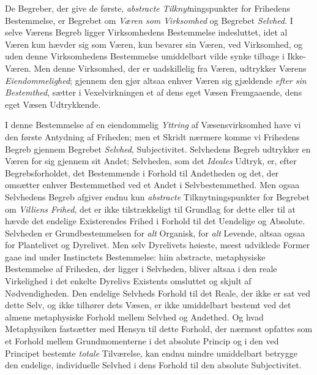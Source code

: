 De Begreber, der give de første, \emph{abstracte Tilknyt}ningspunkter for
Frihedens Bestemmelse, er Begrebet om \emph{Væren som Virksomhed} og Begrebet
\emph{Selvhed}. I selve Værens Begreb ligger Virksomhedens Bestemmelse
indesluttet, idet al Væren kun hævder sig som Væren, kun bevarer sin Væren, ved
Virksomhed, og uden denne Virksomhedens Bestemmelse umiddelbart vilde synke
tilbage i Ikke-Væren. Men denne Virksomhed, der er uadskillelig fra Væren,
udtrykker Værens \emph{Eiendommelighed}; gjennem den gjør altsaa enhver Væren sig
gjældende \emph{efter sin Bestemthed}, sætter i Vexelvirkningen et af dens eget
Væsen Fremgaaende, dens eget Væsen Udtrykkende.

I denne Bestemmelse af en eiendommelig \emph{Yttring} af Væsensvirksomhed have vi
den første Antydning af Friheden; men et Skridt nærmere komme vi Frihedens Begreb
gjennem Begrebet \emph{Selvhed}, Subjectivitet. Selvhedens Begreb udtrykker en
Væren for sig gjennem sit Andet; Selvheden, som det \emph{Ideales} Udtryk, er,
efter Begrebsforholdet, det Bestemmende i Forhold til Andetheden og det, der
omsætter
 enhver Bestemmethed ved et Andet i Selvbestemmethed. Men ogsaa Selvhedens Begreb
afgiver endnu kun \emph{abstracte} Tilknytningspunkter for Begrebet om
\emph{Villiens Frihed}, det er ikke tilstrækkeligt til Grundlag for dette eller
til at hævde det endelige Existerendes Frihed i Forhold til det Uendelige og
Absolute. Selvheden er Grundbestemmelsen for \emph{alt} Organisk, for \emph{alt}
Levende, altsaa ogsaa for Plantelivet og Dyrelivet. Men selv Dyrelivets høieste,
meest udviklede Former gaae ind under Instinctets Bestemmelse: hiin abstracte,
metaphysiske Bestemmelse af Friheden, der ligger i Selvheden, bliver altsaa i den
reale Virkelighed i det enkelte Dyrelivs Existents omsluttet og skjult af
Nødvendigheden. Den endelige Selvheds Forhold til det Reale, der ikke er sat ved
dette Selv, og ikke tilhører dets Væsen, er ikke umiddelbart bestemt ved det
almene metaphysiske Forhold mellem Selvhed og Andethed. Og hvad Metaphysiken
fastsætter med Hensyn til dette Forhold, der nærmest opfattes som et Forhold
mellem Grundmomenterne i det absolute Princip og i den ved Principet bestemte
\emph{totale} Tilværelse, kan endnu mindre umiddelbart betrygge den endelige,
individuelle Selvhed i dens Forhold til den absolute Subjectivitet.


